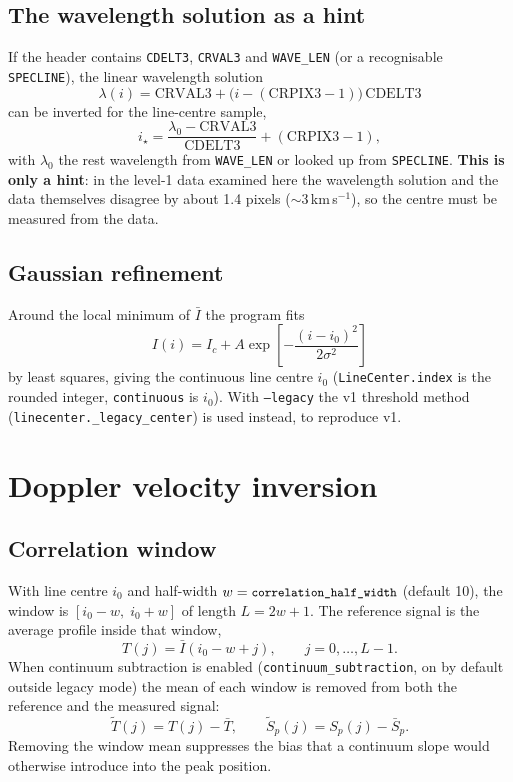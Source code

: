 \documentclass[11pt,a4paper]{article}
\newcommand{\code}[1]{\texttt{\small #1}}
\begin{document}
\subsection{The wavelength solution as a hint}
If the header contains \code{CDELT3}, \code{CRVAL3} and \code{WAVE\_LEN} (or a
recognisable \code{SPECLINE}), the linear wavelength solution
\begin{equation}
  \lambda(i) = \mathrm{CRVAL3} + \bigl(i - (\mathrm{CRPIX3}-1)\bigr)\,\mathrm{CDELT3}
\end{equation}
can be inverted for the line-centre sample,
\begin{equation}
  i_\star = \frac{\lambda_0 - \mathrm{CRVAL3}}{\mathrm{CDELT3}} + (\mathrm{CRPIX3}-1),
  \label{eq:wcscenter}
\end{equation}
with $\lambda_0$ the rest wavelength from \code{WAVE\_LEN} or looked up from
\code{SPECLINE}.  \textbf{This is only a hint}: in the level-1 data examined
here the wavelength solution and the data themselves disagree by about
1.4 pixels ($\sim$3\,km\,s$^{-1}$), so the centre must be measured from the data.

\subsection{Gaussian refinement}
Around the local minimum of $\bar I$ the program fits
\begin{equation}
  I(i) = I_c + A \exp\!\left[-\frac{(i-i_0)^2}{2\sigma^2}\right]
\end{equation}
by least squares, giving the continuous line centre $i_0$
(\code{LineCenter.index} is the rounded integer, \code{continuous} is $i_0$).
With \code{--legacy} the v1 threshold method
(\code{linecenter.\_legacy\_center}) is used instead, to reproduce v1.

\section{Doppler velocity inversion}
\label{sec:inversion}

\subsection{Correlation window}
With line centre $i_0$ and half-width $w = \code{correlation\_half\_width}$
(default 10), the window is $[i_0-w,\; i_0+w]$ of length $L = 2w+1$.  The
reference signal is the average profile inside that window,
\begin{equation}
  T(j) = \bar I(i_0-w+j), \qquad j = 0,\dots,L-1 .
\end{equation}
When continuum subtraction is enabled (\code{continuum\_subtraction}, on by
default outside legacy mode) the mean of each window is removed from both the
reference and the measured signal:
\begin{equation}
  \tilde T(j) = T(j) - \bar T, \qquad
  \tilde S_p(j) = S_p(j) - \bar S_p .
\end{equation}
Removing the window mean suppresses the bias that a continuum slope would
otherwise introduce into the peak position.
\end{document}
